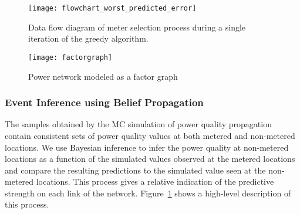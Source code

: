 \begin{figure}[t]
\centering
\texttt{[image: flowchart\_worst\_predicted\_error]}
\caption{Data flow diagram of meter selection process during a single iteration of the greedy algorithm.}
\label{flowchart}
\end{figure}

\begin{figure}[!t]
\centering
\texttt{[image: factorgraph]}
\caption{Power network modeled as a factor graph}
\label{factorgraph}
\end{figure}

\subsubsection{Event Inference using Belief Propagation}
The samples obtained by the MC simulation of power quality propagation contain consistent sets of power quality values at both metered and non-metered locations. We use Bayesian inference to infer the power quality at non-metered locations as a function of the  simulated values observed at the metered locations and compare the resulting predictions to the simulated value seen at the non-metered locations. This process gives a relative indication of the predictive strength on each link of the network. Figure~\ref{flowchart} shows a high-level description of this process.

